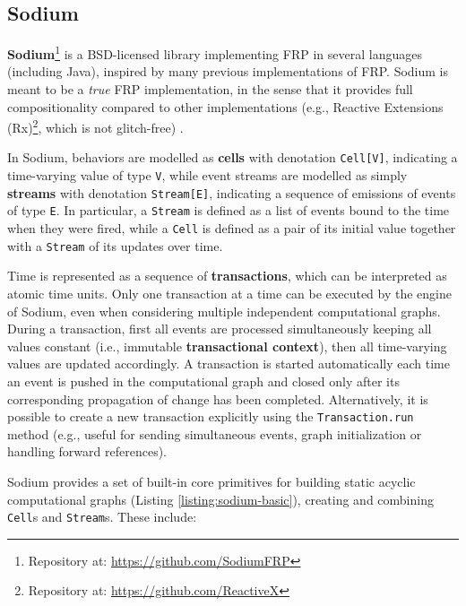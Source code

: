 
\subsection{Sodium}
\label{section:background:technologies:sodium}

\textbf{Sodium}\footnote{Repository at: \url{https://github.com/SodiumFRP}} is a
BSD-licensed library implementing \ac{FRP} in several languages (including
Java), inspired by many previous implementations of \ac{FRP}. Sodium
is meant to be a \textit{true} \ac{FRP} implementation, in the sense that it
provides full compositionality compared to other implementations (e.g., Reactive
Extensions (Rx)\footnote{Repository at: \url{https://github.com/ReactiveX}},
which is not glitch-free) \cite{FRP}.

In Sodium, behaviors are modelled as \textbf{cells} with denotation
\texttt{Cell[V]}, indicating a time-varying value of type \texttt{V}, while
event streams are modelled as simply \textbf{streams} with denotation
\texttt{Stream[E]}, indicating a sequence of emissions of events of type
\texttt{E}. In particular, a \texttt{Stream} is defined as a list of events
bound to the time when they were fired, while a \texttt{Cell} is defined as a
pair of its initial value together with a \texttt{Stream} of its updates over
time.

Time is represented as a sequence of \textbf{transactions}, which can be
interpreted as atomic time units. Only one transaction at a time can be
executed by the engine of Sodium, even when considering multiple independent
computational graphs. During a transaction, first all events are processed
simultaneously keeping all values constant (i.e., immutable
\textbf{transactional context}), then all time-varying values are updated
accordingly. A transaction is started automatically each time an event is
pushed in the computational graph and closed only after its corresponding
propagation of change has been completed. Alternatively, it is possible to
create a new transaction explicitly using the \texttt{Transaction.run} method
(e.g., useful for sending simultaneous events, graph initialization or handling
forward references).

Sodium provides a set of built-in core primitives for building static acyclic
computational graphs (Listing \ref{listing:sodium-basic}), creating and
combining \texttt{Cell}s and \texttt{Stream}s. These include:

